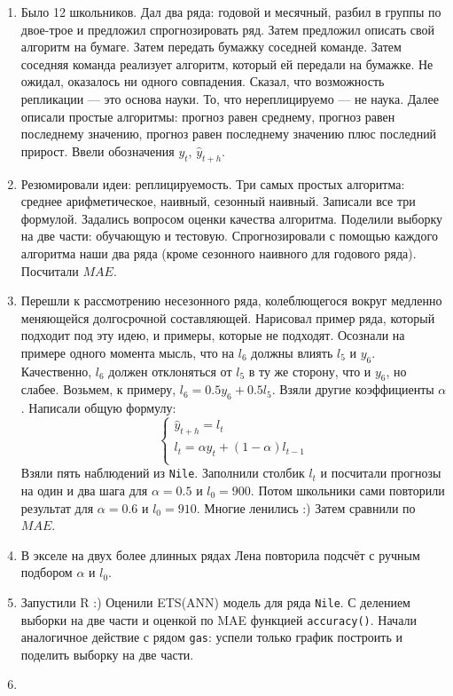 \documentclass[12pt]{article}
\theoremstyle{definition}
\begin{document}
\begin{enumerate}
  \item Было 12 школьников. Дал два ряда: годовой и месячный, разбил в группы по двое-трое и предложил спрогнозировать ряд. 
  Затем предложил описать свой алгоритм на бумаге. Затем передать бумажку соседней команде. Затем соседняя команда реализует 
  алгоритм, который ей передали на бумажке. Не ожидал, оказалось ни одного совпадения. Сказал, что возможность репликации — это основа науки.
  То, что нереплицируемо — не наука. Далее описали простые алгоритмы: прогноз равен среднему, прогноз равен последнему значению,
  прогноз равен последнему значению плюс последний прирост. Ввели обозначения $y_t$, $\hat y_{t+h}$.
  \item Резюмировали идеи: реплицируемость. Три самых простых алгоритма: среднее арифметическое, наивный, сезонный наивный. 
  Записали все три формулой. Задались вопросом оценки качества алгоритма. Поделили выборку на две части: обучающую и тестовую. 
  Спрогнозировали с помощью каждого алгоритма наши два ряда (кроме сезонного наивного для годового ряда). Посчитали $MAE$.
  \item Перешли к рассмотрению несезонного ряда, колеблющегося вокруг медленно меняющейся долгосрочной составляющей. 
  Нарисовал пример ряда, который подходит под эту идею, и примеры, которые не подходят. 
  Осознали на примере одного момента мысль, что на $l_6$ должны влиять $l_5$ и $y_6$. 
  Качественно, $l_6$ должен отклоняться от $l_5$ в ту же сторону, что и $y_6$, но слабее. 
  Возьмем, к примеру, $l_6 = 0.5 y_6 + 0.5 l_5$. Взяли другие коэффициенты $\alpha$. 
  Написали общую формулу: 
  \[
    \begin{cases}
    \hat y_{t+h} = l_t \\
    l_t = \alpha y_t + (1-\alpha) l_{t-1} \\
    \end{cases}
  \]
  Взяли пять наблюдений из \verb|Nile|. Заполнили столбик $l_t$ и посчитали прогнозы на один и два шага для $\alpha = 0.5$ и $l_0 = 900$. Потом школьники сами 
  повторили результат для $\alpha = 0.6$ и $l_0 = 910$. Многие ленились :) Затем сравнили по $MAE$.
  \item В экселе на двух более длинных рядах Лена повторила подсчёт с ручным подбором $\alpha$ и $l_0$. 
  \item Запустили R :) Оценили ETS(ANN) модель для ряда \verb|Nile|. С делением выборки на две части и оценкой по MAE функцией \verb|accuracy()|.
  Начали аналогичное действие с рядом \verb|gas|: успели только график построить и поделить выборку на две части.  
  \item 
\end{enumerate}
\end{document}
